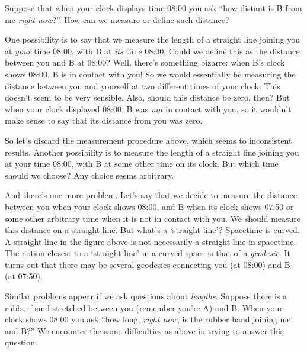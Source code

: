 \documentclass[a4paper,12pt,%
onecolumn,oneside,%
british%
]{memoir}
\providecommand{\href}[2]{#2}
\renewcommand*{\|}[1][]{\nonscript\:#1\vert\nonscript\:\mathopen{}}
\newcommand*{\furl}[2]{\href{#1}{#2}\pagenote{\url{#1}}}
\begin{document}
\medskip

Suppose that when your clock displays time 08:00 you ask \enquote{how distant is B from me \emph{right now}?}. How can we measure or define such distance?

One possibility is to say that we measure the length of a straight line joining you at \emph{your} time 08:00, with B at \emph{its} time 08:00. Could we define this as the distance between you and B at 08:00? Well, there's something bizarre: when B's clock shows 08:00, B is in contact with you! So we would essentially be measuring the distance between you and yourself at two different times of your clock. This doesn't seem to be very sensible. Also, should this distance be zero, then? But when your clock displayed 08:00, B was \emph{not} in contact with you, so it wouldn't make sense to say that its distance from you was zero.

So let's discard the measurement procedure above, which seems to inconsistent results. Another possibility is to measure the length of a straight line joining you at your time 08:00, with B at some other time on its clock. But which time should we choose? Any choice seems arbitrary.

And there's one more problem. Let's say that we decide to measure the distance between you when your clock shows 08:00, and B when its clock shows 07:50 or some other arbitrary time when it is not in contact with you. We should measure this distance on a straight line. But what's a \enquote*{straight line}? Spacetime is curved. A straight line in the figure above is not necessarily a straight line in spacetime. The notion closest to a \enquote*{straight line} in a curved space is that of a \furl{https://mathworld.wolfram.com/Geodesic.html}{\emph{geodesic}}. It turns out that there may be several geodesics connecting you (at 08:00) and B (at 07:50).

Similar problems appear if we ask questions about \emph{lengths}. Suppose there is a rubber band stretched between you (remember you're A) and B. When your clock shows 08:00 you ask \enquote{how long, \emph{right now}, is the rubber band joining me and B?} We encounter the same difficulties as above in trying to answer this question.

\medskip
\end{document}
